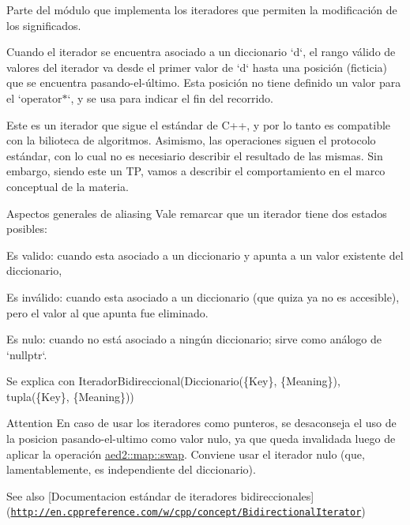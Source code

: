 \-Parte del módulo que implementa los iteradores que permiten la modificación de los significados. 

\-Cuando el iterador se encuentra asociado a un diccionario `d`, el rango válido de valores del iterador va desde el primer valor de `d` hasta una posición (ficticia) que se encuentra pasando-\/el-\/último. \-Esta posición no tiene definido un valor para el `operator$\ast$`, y se usa para indicar el fin del recorrido.

\-Este es un iterador que sigue el estándar de \-C++, y por lo tanto es compatible con la bilioteca de algoritmos. \-Asimismo, las operaciones siguen el protocolo estándar, con lo cual no es necesiario describir el resultado de las mismas. \-Sin embargo, siendo este un \-T\-P, vamos a describir el comportamiento en el marco conceptual de la materia.

\begin{DoxyParagraph}{\-Aspectos generales de aliasing}
\-Vale remarcar que un iterador tiene dos estados posibles\-:
\begin{DoxyEnumerate}
\item \-Es valido\-: cuando esta asociado a un diccionario y apunta a un valor existente del diccionario,
\item \-Es inválido\-: cuando esta asociado a un diccionario (que quiza ya no es accesible), pero el valor al que apunta fue eliminado.
\item \-Es nulo\-: cuando no está asociado a ningún diccionario; sirve como análogo de `nullptr`. 
\end{DoxyEnumerate}
\end{DoxyParagraph}
\begin{DoxyParagraph}{\-Se explica con}
\-Iterador\-Bidireccional(\-Diccionario(\{\-Key\}, \{\-Meaning\}), tupla(\{\-Key\}, \{\-Meaning\}))
\end{DoxyParagraph}
\begin{DoxyAttention}{\-Attention}
\-En caso de usar los iteradores como punteros, se desaconseja el uso de la posicion pasando-\/el-\/ultimo como valor nulo, ya que queda invalidada luego de aplicar la operación \hyperlink{classaed2_1_1map_a43ddb71cc91e5c6021a7a1f243d6cc4a}{aed2\-::map\-::swap}. \-Conviene usar el iterador nulo (que, lamentablemente, es independiente del diccionario).
\end{DoxyAttention}
\begin{DoxySeeAlso}{\-See also}
\mbox{[}\-Documentacion estándar de iteradores bidireccionales\mbox{]}(\href{http://en.cppreference.com/w/cpp/concept/BidirectionalIterator}{\tt http\-://en.\-cppreference.\-com/w/cpp/concept/\-Bidirectional\-Iterator}) 
\end{DoxySeeAlso}



